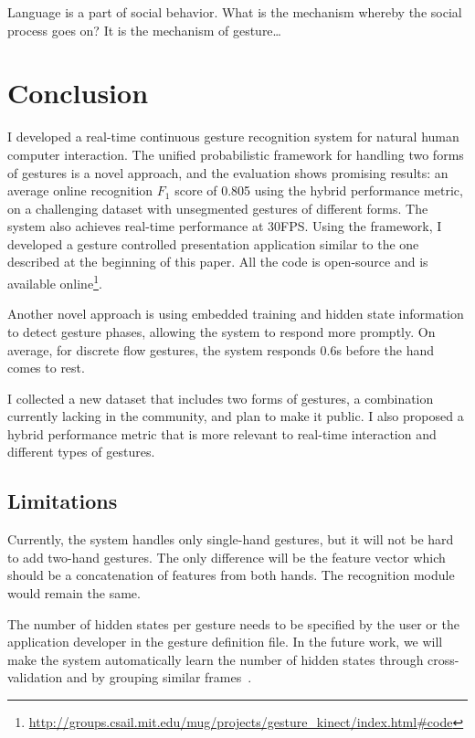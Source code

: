 \begin{savequote}
Language is a part of social behavior. What is the mechanism whereby the social
process goes on? It is the mechanism of gesture\ldots
{}
\end{savequote}
\chapter{Conclusion}
I developed a real-time continuous gesture recognition system for natural
human computer interaction. The
unified probabilistic framework for handling two forms of gestures is a novel
approach, and the evaluation shows promising results: an
average online recognition $F_1$ score of 0.805 using the hybrid performance
metric, on a challenging dataset with unsegmented gestures of different forms.
The system also achieves real-time performance at 30FPS. Using the framework, I
developed a gesture controlled presentation application similar to the one described at the beginning of this paper. All the code is open-source
and is available
online\footnote{\url{http://groups.csail.mit.edu/mug/projects/gesture_kinect/index.html\#code}}.

Another novel approach is using embedded training and hidden state information
to detect gesture phases, allowing the system to respond more promptly. On
average, for discrete flow gestures, the system responds 0.6s before the hand comes to
rest. 

I collected a new dataset that includes two forms of gestures, a
combination currently lacking in the community, and plan to make it
public. I also proposed a hybrid performance metric
that is more relevant to real-time interaction and different types of gestures.

\section{Limitations}
Currently, the system handles only single-hand gestures, but it will not be hard
to add two-hand gestures. The only difference will be the feature vector which
should be a concatenation of features from both hands. The recognition module
would remain the same.

The number of hidden states per gesture needs to be specified by the user or the
application developer in the gesture definition file. In the future work, we
will make the system automatically learn the number of hidden states through
cross-validation and by grouping similar frames~\cite{song13}.

